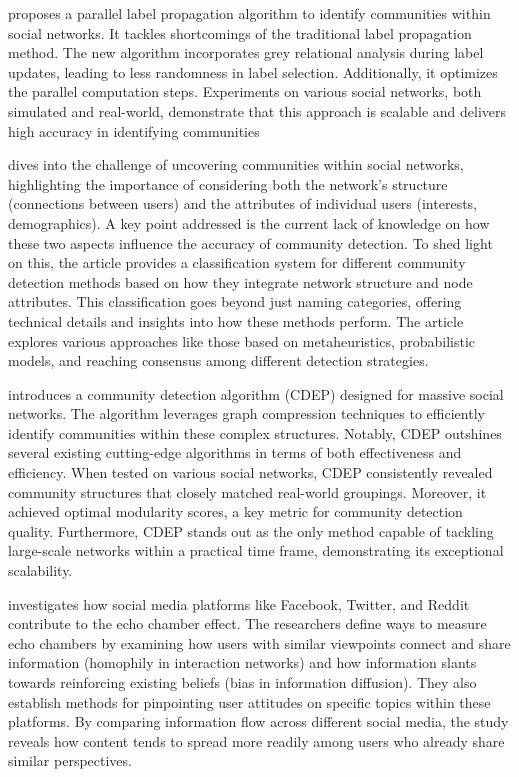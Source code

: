\documentclass[12pt]{article}
\begin{document}
\cite{ZHANG2016133} proposes a parallel label propagation algorithm to identify communities within social networks. 
It tackles shortcomings of the traditional label propagation method. 
The new algorithm incorporates grey relational analysis during label updates, leading to less randomness in label selection. 
Additionally, it optimizes the parallel computation steps. Experiments on various social networks, both simulated and real-world, demonstrate 
that this approach is scalable and delivers high accuracy in identifying communities

\cite{Chunaev_2020} dives into the challenge of uncovering communities within social networks, highlighting the importance of considering both 
the network's structure (connections between users) and the attributes of individual users (interests, demographics).  A key point 
addressed is the current lack of knowledge on how these two aspects influence the accuracy of community detection. 
To shed light on this, the article provides a classification system for different community detection methods based on how they 
integrate network structure and node attributes. This classification goes beyond just naming categories, offering technical details and 
insights into how these methods perform. The article explores various approaches like those based on metaheuristics, probabilistic models, 
and reaching consensus among different detection strategies.

\cite{ZHAO2021358} introduces a community detection algorithm (CDEP) designed for massive social networks. 
The algorithm leverages graph compression techniques to efficiently identify communities within these complex structures. 
Notably, CDEP outshines several existing cutting-edge algorithms in terms of both effectiveness and efficiency. 
When tested on various social networks, CDEP consistently revealed community structures that 
closely matched real-world groupings. Moreover, it achieved optimal modularity scores, a key metric for 
community detection quality.  Furthermore, CDEP stands out as the only method capable of tackling large-scale 
networks within a practical time frame, demonstrating its exceptional scalability. 

\cite{Cinelli_2021} investigates how social media platforms like Facebook, Twitter, and Reddit contribute to the echo chamber effect. 
The researchers define ways to measure echo chambers by examining how users with similar viewpoints connect and share information 
(homophily in interaction networks) and how information slants towards reinforcing existing beliefs (bias in information diffusion).
They also establish methods for pinpointing user attitudes on specific topics within these platforms. 
By comparing information flow across different social media, the study reveals how content 
tends to spread more readily among users who already share similar perspectives. 
\end{document}
